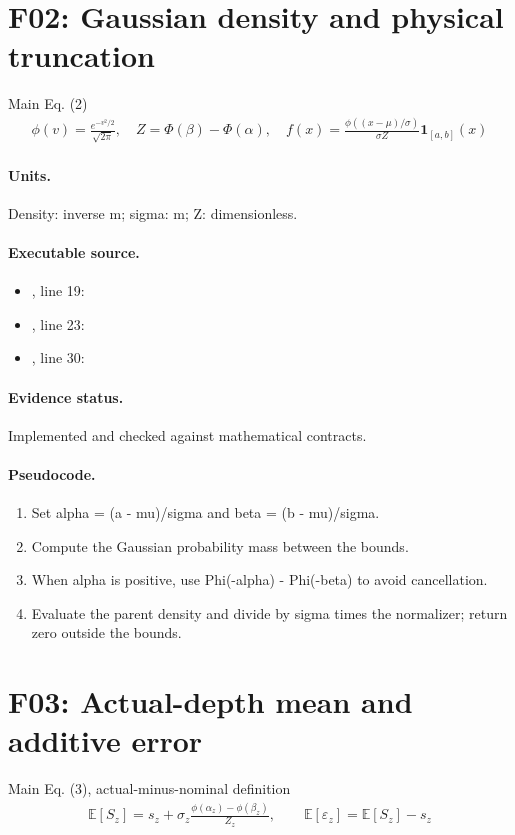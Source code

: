 \documentclass[10pt]{article}
\begin{document}
\section*{F02: Gaussian density and physical truncation}
Main Eq. (2)
\begin{gather*}\phi(v)=\frac{e^{-v^2/2}}{\sqrt{2\pi}},\quad Z=\Phi(\beta)-\Phi(\alpha),\quad f(x)=\frac{\phi((x-\mu)/\sigma)}{\sigma Z}\mathbf1_{[a,b]}(x)\end{gather*}
\paragraph{Units.} Density: inverse m; sigma: m; Z: dimensionless.
\paragraph{Executable source.}
\begin{itemize}[leftmargin=*]
\item {}, line 19: 
\item {}, line 23: 
\item {}, line 30: 
\end{itemize}
\paragraph{Evidence status.} Implemented and checked against mathematical contracts.
\paragraph{Pseudocode.}
\begin{enumerate}[leftmargin=*]
\item Set alpha = (a - mu)/sigma and beta = (b - mu)/sigma.
\item Compute the Gaussian probability mass between the bounds.
\item When alpha is positive, use Phi(-alpha) - Phi(-beta) to avoid cancellation.
\item Evaluate the parent density and divide by sigma times the normalizer; return zero outside the bounds.
\end{enumerate}
\newpage
\section*{F03: Actual-depth mean and additive error}
Main Eq. (3), actual-minus-nominal definition
\begin{gather*}\mathbb E[S_z]=s_z+\sigma_z\frac{\phi(\alpha_z)-\phi(\beta_z)}{Z_z},\qquad\mathbb E[\varepsilon_z]=\mathbb E[S_z]-s_z\end{gather*}
\end{document}
